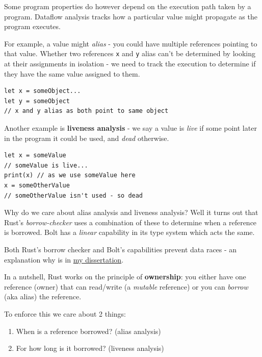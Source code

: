 Some program properties do however depend on the execution path taken by
a program. Dataflow analysis tracks how a particular value might
propagate as the program executes.

For example, a value might \emph{alias} - you could have multiple
references pointing to that value. Whether two references \texttt{x} and
\texttt{y} alias can't be determined by looking at their assignments in
isolation - we need to track the execution to determine if they have the
same value assigned to them.



\begin{verbatim}
let x = someObject...
let y = someObject 
// x and y alias as both point to same object
\end{verbatim}

Another example is \textbf{liveness analysis} - we say a value is
\emph{live} if some point later in the program it could be used, and
\emph{dead} otherwise.



\begin{verbatim}
let x = someValue 
// someValue is live...
print(x) // as we use someValue here
x = someOtherValue 
// someOtherValue isn't used - so dead
\end{verbatim}

Why do we care about alias analysis and liveness analysis? Well it turns
out that Rust's \emph{borrow-checker} uses a combination of these to
determine when a reference is borrowed. Bolt has a \emph{linear}
capability in its type system which acts the same.

Both Rust's borrow checker and Bolt's capabilities prevent data races -
an explanation why is in
\href{https://github.com/mukul-rathi/bolt-dissertation/blob/master/dissertation.pdf}{my
dissertation}.

In a nutshell, Rust works on the principle of \textbf{ownership}: you
either have one reference (owner) that can read/write (a \emph{mutable}
reference) or you can \emph{borrow} (aka alias) the reference.

To enforce this we care about 2 things:

\begin{enumerate}
\tightlist
\item
  When is a reference borrowed? (alias analysis)
\item
  For how long is it borrowed? (liveness analysis)
\end{enumerate}

